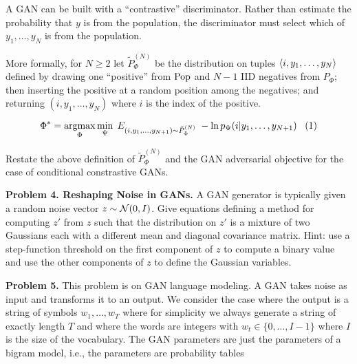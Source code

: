 \documentclass{article}
\newcommand{\solution}[1]{\bigskip {\color{red} {\bf Solution}: #1}}
\begin{document}
A GAN can be built with a ``contrastive'' discriminator.  Rather than
estimate the probability that $y$ is from the population, the
discriminator must select which of $y_1,\ldots,y_N$ is from the
population.

\medskip
More formally, for $N \geq 2$ let $\tilde{P}_\Phi^{(N)}$ be the distribution on tuples ${\mbox{$\langle i,y_1,\ldots,y_N\rangle$}}$ defined by drawing one
``positive'' from $\mathrm{Pop}$ and $N-1$ IID negatives from $P_\Phi$; then
inserting the positive at a random position among the negatives; and
returning $(i,y_1,\ldots,y_N)$ where $i$ is the index of the positive.

$$\Phi^* = \operatorname*{argmax}_\Phi \min_\Psi \;E_{(i,y_1,\ldots,y_{N+1}) \sim \tilde{P}_\Phi^{(N)}}\; - \ln p_\Psi(i|y_1,\ldots,y_{N+1}) \;\;\;(1)$$

\medskip
Restate the above definition of $\tilde{P}_\Phi^{(N)}$ and the GAN adversarial objective for the case of conditional constrastive GANs.

\solution{
  $$\Phi^* = \argmax_\Phi \min_\Psi \;E_{(i,y_1,\ldots,y_{N+1},x) \sim \tilde{P}^{(N)}_\Phi} \ln - P_\Psi(i|y_1,\ldots,y_{N+1},x)$$
}

\bigskip 

{\bf Problem 4. Reshaping Noise in GANs.} A GAN generator is typically given a random noise vector $z \sim {\cal N}(0,I)$.  Give equations defining a method for computing $z'$ from $z$ such that
the distribution on $z'$ is a
mixture of two Gaussians each with a different mean and diagonal covariance matrix.  Hint: use a step-function threshold on the first component of $z$ to compute a binary value and use the other components
of $z$ to define the Gaussian variables.

\solution{
  \begin{eqnarray*}
    y & = & \mathbf{1}[z[0] \geq 0] \\
    \\
    z' & = & y(\mu_1 + \sigma_1 \odot z[1:d]) + (1-y)(\mu_2 + \sigma_2 \odot z[1:d])
  \end{eqnarray*}
}
    

\bigskip
{\bf Problem 5.}  This problem is on GAN language modeling.  A GAN takes noise as input and transforms it to an output.  We consider the case where the output is a string of symbols $w_1,\ldots, w_T$
where for simplicity we always generate a string of exactly length $T$ and where the words are integers with $w_t \in \{0,\ldots,I-1\}$ where $I$ is the size of the vocabulary.
The GAN parameters are just the parameters of a bigram model, i.e., the parameters are probability tables
\end{document}
